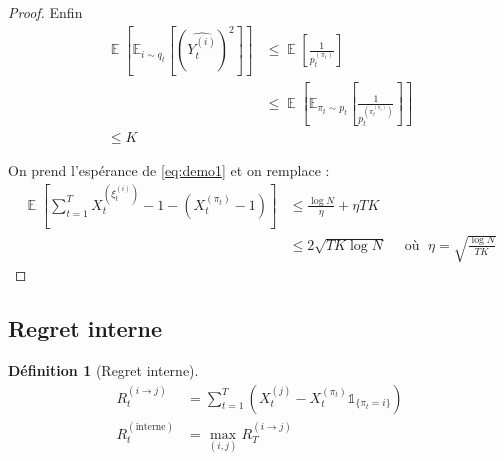 \documentclass{article}
\DeclareMathOperator*{\E}{\mathbb{E}}
\newtheorem{definition}{Définition}[section]
\theoremstyle{remark}
\theoremstyle{remark}
\begin{document}
\begin{proof}
   Enfin
   \begin{align*}
      \E\left[ \mathbb{E}_{i \sim q_t} \left[ \left(\widehat{Y_t^{(i)}}\right)^2 \right] \right]
      &\leq \E\left[ \frac{1}{p_t^{(\pi_t)}} \right] \\
      &\leq \E\left[ \mathbb{E}_{\pi_t \sim p_t} \left[ \frac{1}{p_t^{(\pi_t^{(\pi_t)})}} \right] \right] \\
      \leq K
   \end{align*}

   On prend l'espérance de \eqref{eq:demo1} et on remplace :
   \begin{align*}
      \E \left[ \sum_{t=1}^T X_t^{(\xi_t^{(i)})} -1  - (X_t^{(\pi_t)} - 1)\right]
      &\leq \frac{\log N}{\eta} + \eta T K \\
      &\leq 2 \sqrt{T K \log N} \quad \text{ où } \; \eta = \sqrt{\frac{\log N}{TK}}
   \end{align*}
\end{proof}

\subsection{Regret interne}

\begin{definition}[Regret interne]
   \begin{align*}
      R_t^{(i \rightarrow j)} &= \sum_{t=1}^T \left( X_t^{(j)} - X_t^{(\pi_t)} \mathbb{1}_{\{ \pi_t = i \}} \right) \\
      R_t^{(\text{interne})} &= \max_{(i,j)} R_T^{(i \rightarrow j)}
   \end{align*}
\end{definition}
\end{document}
